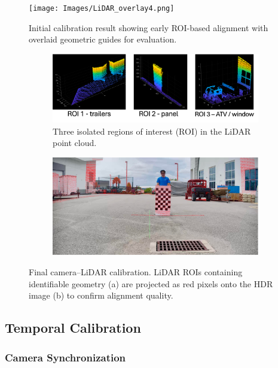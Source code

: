 \documentclass{erauthesis}
\begin{document}
\begin{figure}[ht]
    \centering
    \texttt{[image: Images/LiDAR\_overlay4.png]}
    \caption{Initial calibration result showing early ROI-based alignment with overlaid geometric guides for evaluation.}
    \label{fig:LiDAR_overlay4}
\end{figure}
\begin{figure}[htp]
\begin{subfigure}{\textwidth}
\centering
\includegraphics[width=0.94\linewidth]{Images/LiDAR_overlay3A.png}
    \caption{Three isolated regions of interest (ROI) in the LiDAR point cloud.}
    \label{fig:LiDAR_overlay3A}
\end{subfigure}
\bigskip
\begin{subfigure}{\textwidth}
\centering
\includegraphics[width=0.94\linewidth]{Images/LiDAR_overlay3B.png}
    \caption{}
    \label{fig:LiDAR_overlay3B.png}
\end{subfigure}
\caption{Final camera–LiDAR calibration. LiDAR ROIs containing identifiable geometry (a) are projected as red pixels onto the HDR image (b) to confirm alignment quality.}
\label{HDR_calib_final}
\end{figure}

\subsection{Temporal Calibration} \label{time_sync}


\subsubsection{Camera Synchronization} \label{time_sync_cam}

\end{document}
